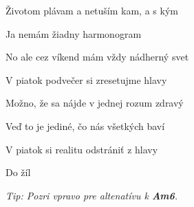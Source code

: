 \begin{song}
\bigskip

 Životom plávam a netuším kam, a s kým \par
{} Ja nemám žiadny harmonogram \par
No ale cez víkend mám  vždy nádherný svet \par

\bigskip

\Refren

\bigskip

V piatok podvečer si zresetujme hlavy \par
{}Možno, že sa nájde v jednej rozum zdravý  \par
{} Veď to je jediné, čo  nás všetkých baví \par
{} V piatok si realitu  odstrániť z hlavy \par
Do žíl \par

\begin{strumbox}
\normalsize
{}
\end{strumbox}

\bigskip

\bigskip

{
\smaller\it
Tip: Pozri vpravo pre altenatívu k \textbf{Am6}.
}

\end{song}
